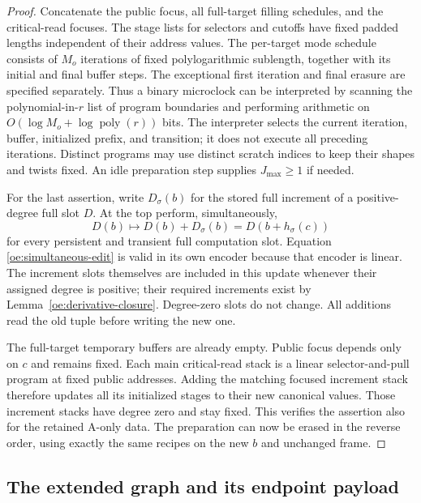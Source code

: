 \begin{proof}
Concatenate the public focus, all full-target filling schedules, and the
critical-read focuses. The stage lists for selectors and cutoffs have
fixed padded lengths independent of their address values. The
per-target mode schedule consists of $M_o$ iterations of fixed
polylogarithmic sublength, together with its initial and final buffer
steps. The exceptional first iteration and final erasure are specified
separately. Thus a binary microclock can be interpreted by scanning the
polynomial-in-$r$ list of program boundaries and performing arithmetic
on $O(\log M_o+\log\operatorname{poly}(r))$ bits. The interpreter selects
the current iteration, buffer, initialized prefix, and transition; it
does not execute all preceding iterations. Distinct programs may use
distinct scratch indices to keep their shapes and twists fixed.
An idle preparation step supplies $J_{\max}\geq1$ if needed.

For the last assertion, write $D_\sigma(b)$ for the stored full increment
of a positive-degree full slot $D$. At the top perform, simultaneously,
\begin{equation}\label{oe:simultaneous-edit}
 D(b)\longmapsto D(b)+D_\sigma(b)
             =D(b+h_\sigma(c))
\end{equation}
for every persistent and transient full computation slot. Equation
\eqref{oe:simultaneous-edit} is valid in its own encoder because that
encoder is linear. The increment slots themselves are included in this
update whenever their assigned degree is positive; their required
increments exist by Lemma~\ref{oe:derivative-closure}. Degree-zero slots
do not change. All additions read the old tuple before writing the new
one.

The full-target temporary buffers are already empty. Public focus
depends only on $c$ and remains fixed. Each main critical-read stack is a
linear selector-and-pull program at fixed public addresses. Adding the
matching focused increment stack therefore updates all its initialized
stages to their new canonical values. Those increment stacks have degree
zero and stay fixed. This verifies the assertion also for the retained
A-only data. The preparation can now be erased in the reverse order,
using exactly the same recipes on the new $b$ and unchanged frame.
\end{proof}

\subsection{The extended graph and its endpoint payload}

